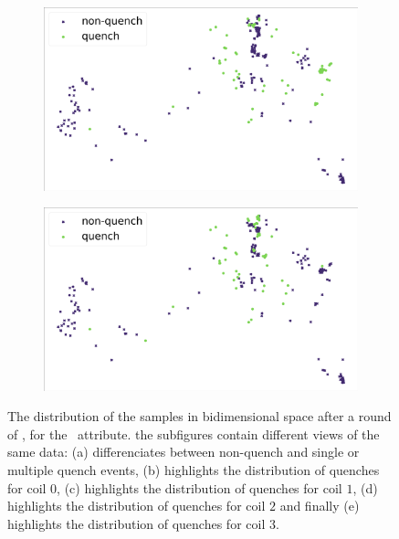 \begin{figure}[!h]
\begin{subfigure}{0.49\linewidth}
		\subcaption{}
	\end{subfigure}
	\begin{subfigure}{0.49\linewidth}
		\includegraphics[width=\linewidth]{img/quench_dist_qlp/quenches_coil_2_Phi.png}
		\subcaption{}
	\end{subfigure}
	\begin{subfigure}{0.49\linewidth}
		\includegraphics[width=\linewidth]{img/quench_dist_qlp/quenches_coil_3_Phi.png}
		\subcaption{}
	\end{subfigure}
	\caption{The distribution of the samples in bidimensional space after a round of \pca, for
		the \phin\ attribute. the subfigures contain different views of the same data: (a) differenciates between non-quench and single or multiple quench events, (b) highlights the distribution of quenches for coil $0$, (c) highlights the distribution of quenches for coil $1$, (d) highlights the distribution of quenches for coil $2$ and finally (e) highlights the distribution of quenches for coil $3$.}
	\label{fig:phi-coilq-dist}
\end{figure}

